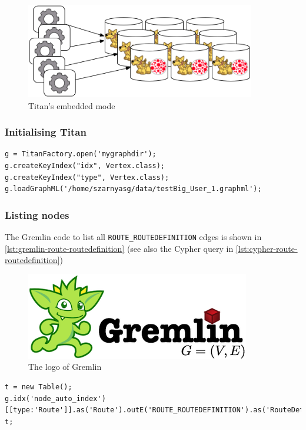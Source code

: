 \begin{figure}
\begin{center}
\includegraphics[width=10cm]{figures/titan-modes-embedded}
\caption{Titan's embedded mode}
\label{fig:titan-modes-embedded}
\end{center}
\end{figure}

\subsubsection{Initialising Titan}

\begin{lstlisting}[caption=Gremlin commands to initialize the a single-node Titan instance, label=lst:titan-singlenode, breaklines=true]
g = TitanFactory.open('mygraphdir');
g.createKeyIndex("idx", Vertex.class);
g.createKeyIndex("type", Vertex.class);
g.loadGraphML('/home/szarnyasg/data/testBig_User_1.graphml');
\end{lstlisting}

\subsubsection{Listing nodes}

The Gremlin code to list all \texttt{ROUTE\_ROUTEDEFINITION} edges is shown in \autoref{lst:gremlin-route-routedefinition} (see also the Cypher query in \autoref{lst:cypher-route-routedefinition})

\begin{figure}
\begin{center}
\includegraphics[]{figures/gremlin-logo}
\caption{The logo of Gremlin}
\label{fig:gremlin-logo}
\end{center}
\end{figure}

\begin{lstlisting}[caption=Gremlin query to retrieve all \texttt{ROUTE\_ROUTEDEFINITION} edges, label=lst:gremlin-route-routedefinition, breaklines=true]
t = new Table(); 
g.idx('node_auto_index')[[type:'Route']].as('Route').outE('ROUTE_ROUTEDEFINITION').as('RouteDefinition').inV.as('Sensor').table(t).iterate();
t;
\end{lstlisting}
